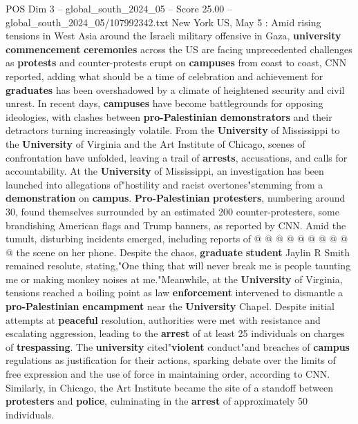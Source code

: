 \begin{textsample}{POS Dim 3 – global\_south\_2024\_05 – Score 25.00 – global\_south\_2024\_05/107992342.txt}  \label{ex:f3_pos_099}
New York US, May 5 : Amid rising tensions in West Asia around the Israeli military offensive in Gaza, \textbf{university} \textbf{commencement} \textbf{ceremonies} across the US are facing unprecedented challenges as \textbf{protests} and counter-protests erupt on \textbf{campuses} from coast to coast, CNN reported, adding what should be a time of celebration and achievement for \textbf{graduates} has been overshadowed by a climate of heightened security and civil unrest.
In recent days, \textbf{campuses} have become battlegrounds for opposing ideologies, with clashes between \textbf{pro-Palestinian} \textbf{demonstrators} and their detractors turning increasingly volatile.
From the \textbf{University} of Mississippi to the \textbf{University} of Virginia and the Art Institute of Chicago, scenes of confrontation have unfolded, leaving a trail of \textbf{arrests}, accusations, and calls for accountability.
At the \textbf{University} of Mississippi, an investigation has been launched into allegations of"hostility and racist overtones"stemming from a \textbf{demonstration} on \textbf{campus}. \textbf{Pro-Palestinian} \textbf{protesters}, numbering around 30, found themselves surrounded by an estimated 200 counter-protesters, some brandishing American flags and Trump banners, as reported by CNN.
Amid the tumult, disturbing incidents emerged, including reports of @ @ @ @ @ @ @ @ @ @ the scene on her phone.
Despite the chaos, \textbf{graduate} \textbf{student} Jaylin R Smith remained resolute, stating,"One thing that will never break me is people taunting me or making monkey noises at me."Meanwhile, at the \textbf{University} of Virginia, tensions reached a boiling point as law \textbf{enforcement} intervened to dismantle a \textbf{pro-Palestinian} \textbf{encampment} near the \textbf{University} Chapel.
Despite initial attempts at \textbf{peaceful} resolution, authorities were met with resistance and escalating aggression, leading to the \textbf{arrest} of at least 25 individuals on charges of \textbf{trespassing}.
The \textbf{university} cited"\textbf{violent} conduct"and breaches of \textbf{campus} regulations as justification for their actions, sparking debate over the limits of free expression and the use of force in maintaining order, according to CNN.
Similarly, in Chicago, the Art Institute became the site of a standoff between \textbf{protesters} and \textbf{police}, culminating in the \textbf{arrest} of approximately 50 individuals.

\end{textsample}
